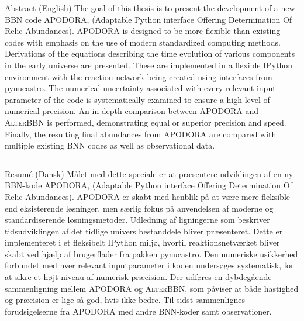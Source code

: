 \thispagestyle{chapter}

\begin{multiabstract}{Abstract (English)} 
\noindent The goal of this thesis is to present the development of a new BBN code APODORA, (Adaptable Python interface Offering Determination Of Relic Abundances). APODORA is designed to be more flexible than existing codes with emphasis on the use of modern standardized computing methods. Derivations of the equations describing the time evolution of various components in the early universe are presented. These are implemented in a flexible IPython environment with the reaction network being created using interfaces from pynucastro\cite{pynucastro2}. The numerical uncertainty associated with every relevant input parameter of the code is systematically examined to ensure a high level of numerical precision. An in depth comparison between APODORA and \textsc{AlterBBN} is performed, demonstrating equal or superior precision and speed. Finally, the resulting final abundances from APODORA are compared with multiple existing BNN codes as well as observational data.

\end{multiabstract}


\plainbreak{2}

\begin{multiabstract}{Resumé (Dansk)}
\noindent Målet med dette speciale er at præsentere udviklingen af en ny BBN-kode APODORA, (Adaptable Python interface Offering Determination Of Relic Abundances). APODORA er skabt med henblik på at være mere fleksible end eksisterende løsninger, men særlig fokus på anvendelsen af moderne og standardiserende løsningsmetoder. Udledning af ligningerne som beskriver tidsudviklingen af det tidlige univers bestanddele bliver præsenteret. Dette er implementeret i et fleksibelt IPython miljø, hvortil reaktionsnetværket bliver skabt ved hjælp af brugerflader fra pakken pynucastro\cite{pynucastro2}. Den numeriske usikkerhed forbundet med hver relevant inputparameter i koden undersøges systematisk, for at sikre et højt niveau af numerisk præcision. Der udføres en dybdegående sammenligning mellem APODORA og \textsc{AlterBBN}, som påviser at både hastighed og præcision er lige så god, hvis ikke bedre. Til sidst sammenlignes forudsigelserne fra APODORA med andre BNN-koder samt observationer.

\end{multiabstract}

